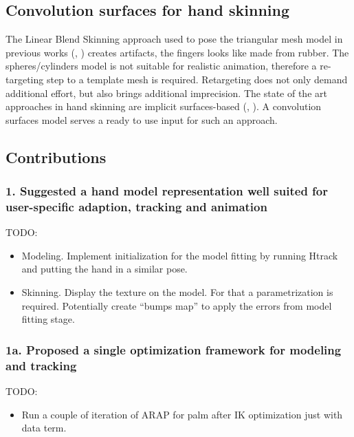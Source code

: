 \subsection{Convolution surfaces for hand skinning}
The Linear Blend Skinning approach used to pose the triangular mesh model in previous works (\cite{sharp2015accurate}, \cite{schroder2013analysis} ) creates artifacts, the fingers looks like made from rubber. The spheres/cylinders model is not suitable for realistic animation, therefore a re-targeting step to a template mesh is required. Retargeting does not only demand additional effort, but also brings additional imprecision. The state of the art approaches in hand skinning are implicit surfaces-based (\cite{vaillant2013implicit},  \cite{vaillant2014robust} ).  A convolution surfaces model serves a ready to use input for such an approach.

\subsection{Contributions}

\subsubsection*{1. Suggested a hand model representation well suited for user-specific adaption, tracking and animation}

TODO: 

\begin{itemize}
\item Modeling. Implement initialization for the model fitting by running Htrack and putting the hand in a similar pose. 
\item Skinning. Display the texture on the model. For that a parametrization is required. Potentially create ``bumps map'' to apply the errors from model fitting stage. 
\end{itemize}

\subsubsection*{1a. Proposed a single optimization framework for modeling and tracking}

TODO:

\begin{itemize}
\item Run a couple of iteration of ARAP for palm after IK optimization just with data term.
\end{itemize}

